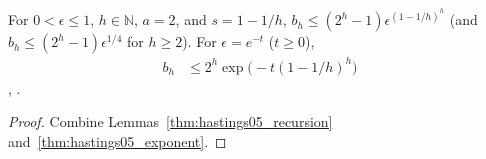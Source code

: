 \begin{lemma}
    \label{thm:hastings05_final_bound}
    \leanok
    For $0<\epsilon\le1$, $h\in\mathbb N$, $a=2$, and $s=1-1/h$,
    $b_h\le(2^h-1)\epsilon^{(1-1/h)^h}$ (and $b_h\le(2^h-1)\epsilon^{1/4}$ for
    $h\ge2$). For $\epsilon=e^{-t}$ ($t\ge0$),
    \begin{align}
        b_h & \le2^h\exp\bigl(-t(1-1/h)^h\bigr)
        \label{eq:hastings05_final_bound}
    \end{align}
    \cite[lines 705--707]{Hastings2006Solving},
    \cite{gap:hastings05_hierarchical_projection}.
\end{lemma}
\begin{proof}\leanok
    Combine Lemmas~\ref{thm:hastings05_recursion}
    and~\ref{thm:hastings05_exponent}.
\end{proof}

